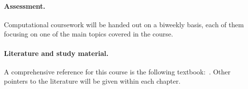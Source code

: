 \paragraph{Assessment.}%
\label{par:assessment}
Computational coursework will be handed out on a biweekly basis,
each of them focusing on one of the main topics covered in the course.

\paragraph{Literature and study material.}%
A comprehensive reference for this course is the following textbook:~.
Other pointers to the literature will be given within each chapter.
